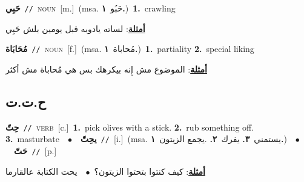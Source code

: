 \documentclass[10pt,a4paper,twoside]{article} %
\begin{document}
\begin{multicols}{2}
{{{{{{{{{\setlength\topsep{0pt}\textbf{\foreignlanguage{arabic}{حَبِي}}\ {\color{gray}\texttt{//}\color{black}}\ \textsc{noun}\ [m.]\ \color{gray}(msa. \foreignlanguage{arabic}{حَبُو}~\foreignlanguage{arabic}{\textbf{١.}})\color{black}\ \textbf{1.}~crawling\  \begin{flushright}\color{gray}\foreignlanguage{arabic}{\textbf{\underline{\foreignlanguage{arabic}{أمثلة}}}: لساته يادوبه قبل يومين بلش حَبِي}\end{flushright}\color{black}} \vspace{2mm}

{\setlength\topsep{0pt}\textbf{\foreignlanguage{arabic}{مُحَابَاة}}\ {\color{gray}\texttt{//}\color{black}}\ \textsc{noun}\ [f.]\ \color{gray}(msa. \foreignlanguage{arabic}{مُحاباة}~\foreignlanguage{arabic}{\textbf{١.}})\color{black}\ \textbf{1.}~partiality  \textbf{2.}~special liking\  \begin{flushright}\color{gray}\foreignlanguage{arabic}{\textbf{\underline{\foreignlanguage{arabic}{أمثلة}}}: الموضوع مش إِنه بيكرهك بس هي مُحاباة مش أكثر}\end{flushright}\color{black}} \vspace{2mm}

\vspace{-3mm}
\subsection*{\color{blue}\foreignlanguage{arabic}{ح.ت.ت}\color{blue}{}} 

{\setlength\topsep{0pt}\textbf{\foreignlanguage{arabic}{حِتّ}}\ {\color{gray}\texttt{//}\color{black}}\ \textsc{verb}\ [c.]\ \textbf{1.}~pick olives with a stick.  \textbf{2.}~rub something off.  \textbf{3.}~masturbate\ \ $\bullet$\ \ \setlength\topsep{0pt}\textbf{\foreignlanguage{arabic}{يحِتّ}}\ {\color{gray}\texttt{//}\color{black}}\ [i.]\ \color{gray}(msa. \foreignlanguage{arabic}{يستمني}~\foreignlanguage{arabic}{\textbf{٣.}}  \foreignlanguage{arabic}{يفرك}~\foreignlanguage{arabic}{\textbf{٢.}}  .\foreignlanguage{arabic}{يجمع الزيتون}~\foreignlanguage{arabic}{\textbf{١.}})\color{black}\ \ $\bullet$\ \ \setlength\topsep{0pt}\textbf{\foreignlanguage{arabic}{حَتّ}}\ {\color{gray}\texttt{//}\color{black}}\ [p.]\  \begin{flushright}\color{gray}\foreignlanguage{arabic}{\textbf{\underline{\foreignlanguage{arabic}{أمثلة}}}: كيف كنتوا بتحتوا الزيتون؟\ $\bullet$\ \  يحت الكتابة عالقارما}\end{flushright}\color{black}} \vspace{2mm}

}}}}}}}}
\end{multicols}
\end{document}
